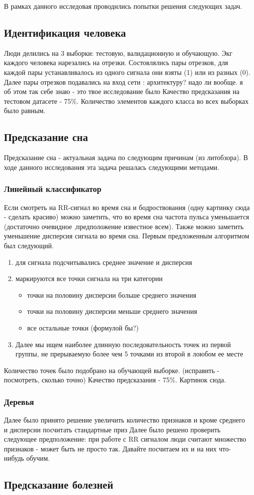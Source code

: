В рамках данного исследовая проводились попытки решения следующих задач.
\subsection{Идентификация человека}
Люди делились на 3 выборки: тестовую, валидационную и обучающую. Экг каждого человека нарезались на отрезки. Состовлялись пары отрезков, для каждой пары устанавливалось из одного сигнала они взяты (1) или из разных (0). Далее пары отрезков подавались на вход сети :
 архитектуру? надо ли вообще. я об этом так себе знаю - это твое исследование было
Качество предсказания на тестовом датасете - 75\%. Количество элементов каждого класса во всех выборках было равным.
\subsection{Предсказание сна}
Предсказание сна - актуальная задача по следующим причинам (из литобзора).
В ходе данного исследования эта задача решалась следующими методами.
\subsubsection{Линейный классификатор}
Если смотреть на RR-сигнал во время сна и бодроствования (одну картинку сюда - сделать красиво) можно заметить, что во время сна частота пульса уменьшается (достаточно очевидное ,предположение известное всем). Также можно заметить уменьшение дисперсия сигнала во время сна.
Первым предложенным алгоритмом был следующий.
\begin{enumerate}
	\item для сигнала подсчитывались среднее значение и дисперсия
	\item маркируются все точки сигнала на три категории
	\begin{itemize}
		\item точки на половину дисперсии больше среднего значения
		\item точки на половину дисперсии меньше среднего значения
		\item все остальные точки (формулой бы?)
	\end{itemize}
	\item Далее мы ищем наиболее длинную последовательность точек из первой группы, не прерываемую более чем 5 точками из второй в лоюбом ее месте
\end{enumerate}
Количество точек было подобрано на обучающей выборке. (исправить - посмотреть, сколько точно)
Качество предсказания - 75\%.
Картинок сюда.
\subsubsection{Деревья}
Далее было принято решение увеличить количество признаков и кроме среднего и дисперсии посчитать стандартные приз
Далее было решено проверить следующее предположение: при работе с RR сигналом люди считают множество признаков - может быть не просто так. Давайте посчитаем их и на них что-нибудь обучим.
\subsection{Предсказание болезней}